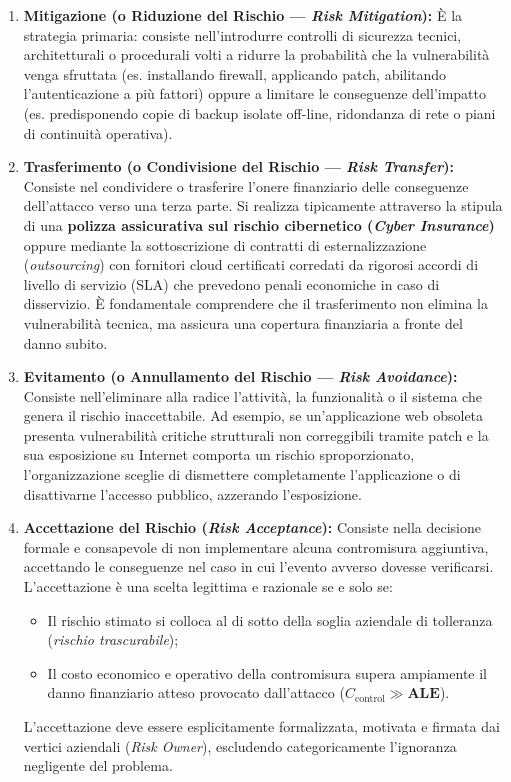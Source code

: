 \documentclass[../../main.tex]{subfiles}
\begin{document}
\begin{enumerate}
    \item \textbf{Mitigazione (o Riduzione del Rischio --- \textit{Risk Mitigation}):} È la strategia primaria: consiste nell'introdurre controlli di sicurezza tecnici, architetturali o procedurali volti a ridurre la probabilità che la vulnerabilità venga sfruttata (es. installando firewall, applicando patch, abilitando l'autenticazione a più fattori) oppure a limitare le conseguenze dell'impatto (es. predisponendo copie di backup isolate off-line, ridondanza di rete o piani di continuità operativa).
    
    \item \textbf{Trasferimento (o Condivisione del Rischio --- \textit{Risk Transfer}):} Consiste nel condividere o trasferire l'onere finanziario delle conseguenze dell'attacco verso una terza parte. Si realizza tipicamente attraverso la stipula di una \textbf{polizza assicurativa sul rischio cibernetico (\textit{Cyber Insurance})} oppure mediante la sottoscrizione di contratti di esternalizzazione (\textit{outsourcing}) con fornitori cloud certificati corredati da rigorosi accordi di livello di servizio (SLA) che prevedono penali economiche in caso di disservizio. È fondamentale comprendere che il trasferimento non elimina la vulnerabilità tecnica, ma assicura una copertura finanziaria a fronte del danno subito.
    
    \item \textbf{Evitamento (o Annullamento del Rischio --- \textit{Risk Avoidance}):} Consiste nell'eliminare alla radice l'attività, la funzionalità o il sistema che genera il rischio inaccettabile. Ad esempio, se un'applicazione web obsoleta presenta vulnerabilità critiche strutturali non correggibili tramite patch e la sua esposizione su Internet comporta un rischio sproporzionato, l'organizzazione sceglie di dismettere completamente l'applicazione o di disattivarne l'accesso pubblico, azzerando l'esposizione.
    
    \item \textbf{Accettazione del Rischio (\textit{Risk Acceptance}):} Consiste nella decisione formale e consapevole di non implementare alcuna contromisura aggiuntiva, accettando le conseguenze nel caso in cui l'evento avverso dovesse verificarsi. L'accettazione è una scelta legittima e razionale se e solo se:
    \begin{itemize}
        \item Il rischio stimato si colloca al di sotto della soglia aziendale di tolleranza (\textit{rischio trascurabile});
        \item Il costo economico e operativo della contromisura supera ampiamente il danno finanziario atteso provocato dall'attacco ($C_{\text{control}} \gg \mathbf{ALE}$).
    \end{itemize}
    L'accettazione deve essere esplicitamente formalizzata, motivata e firmata dai vertici aziendali (\textit{Risk Owner}), escludendo categoricamente l'ignoranza negligente del problema.
\end{enumerate}
\end{document}
